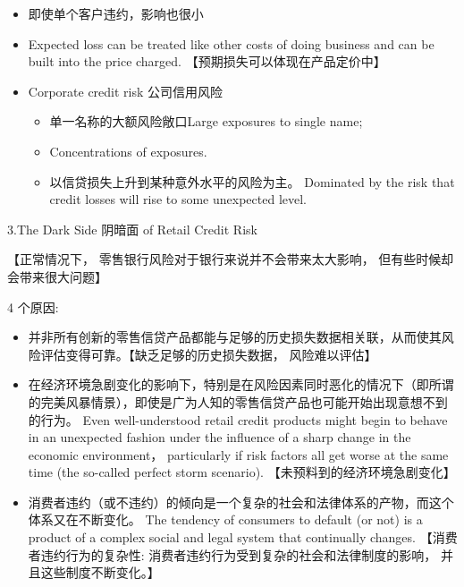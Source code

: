 \begin{itemize}
\item 即使单个客户违约，影响也很小

\item Expected loss can be treated like other costs of doing business and can be built into the price charged. 【预期损失可以体现在产品定价中】

\item Corporate credit risk 公司信用风险
\begin{itemize}

    \item 单一名称的大额风险敞口Large exposures to single name;

    \item Concentrations of exposures.

    \item 以信贷损失上升到某种意外水平的风险为主。 Dominated by the risk that credit losses will rise to some unexpected level.
\end{itemize}

\end{itemize}

3.The Dark Side 阴暗面 of Retail Credit Risk

【正常情况下， 零售银行风险对于银行来说并不会带来太大影响， 但有些时候却会带来很大问题】

4 个原因:

\begin{itemize}
\item 并非所有创新的零售信贷产品都能与足够的历史损失数据相关联，从而使其风险评估变得可靠。【缺乏足够的历史损失数据， 风险难以评估】
\end{itemize}

\begin{itemize}
\item 在经济环境急剧变化的影响下，特别是在风险因素同时恶化的情况下（即所谓的完美风暴情景），即使是广为人知的零售信贷产品也可能开始出现意想不到的行为。 Even well-understood retail credit products might begin to behave in an unexpected fashion under the influence of a sharp change in the economic environment， particularly if risk factors all get worse at the same time (the so-called perfect storm scenario). 【未预料到的经济环境急剧变化】
\end{itemize}

\begin{itemize}
\item 消费者违约（或不违约）的倾向是一个复杂的社会和法律体系的产物，而这个体系又在不断变化。 The tendency of consumers to default (or not) is a product of a complex social and legal system that continually changes. 【消费者违约行为的复杂性: 消费者违约行为受到复杂的社会和法律制度的影响， 并且这些制度不断变化。】
\end{itemize}

